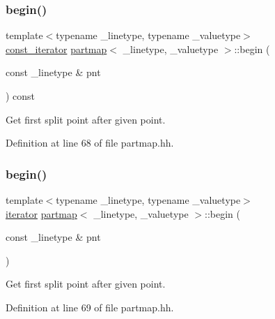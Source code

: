 \subsubsection{\texorpdfstring{begin()}{begin()}\hspace{0.1cm}{\footnotesize\ttfamily [3/4]}}
{\footnotesize\ttfamily template$<$typename \+\_\+linetype, typename \+\_\+valuetype$>$ \\
\mbox{\hyperlink{classpartmap_a01c7ea382b2a493dbd4a4431a2c39520}{const\+\_\+iterator}} \mbox{\hyperlink{classpartmap}{partmap}}$<$ \+\_\+linetype, \+\_\+valuetype $>$\+::begin (\begin{DoxyParamCaption}\item[{const \+\_\+linetype \&}]{pnt }\end{DoxyParamCaption}) const\hspace{0.3cm}{\ttfamily [inline]}}



Get first split point after given point. 



Definition at line 68 of file partmap.\+hh.

\mbox{\label{classpartmap_a5e11ec5430a4d4d8fab30dddf3b2ec4c}} 
\subsubsection{\texorpdfstring{begin()}{begin()}\hspace{0.1cm}{\footnotesize\ttfamily [4/4]}}
{\footnotesize\ttfamily template$<$typename \+\_\+linetype, typename \+\_\+valuetype$>$ \\
\mbox{\hyperlink{classpartmap_a795a7501233dbf866b98a51585552d06}{iterator}} \mbox{\hyperlink{classpartmap}{partmap}}$<$ \+\_\+linetype, \+\_\+valuetype $>$\+::begin (\begin{DoxyParamCaption}\item[{const \+\_\+linetype \&}]{pnt }\end{DoxyParamCaption})\hspace{0.3cm}{\ttfamily [inline]}}



Get first split point after given point. 



Definition at line 69 of file partmap.\+hh.


